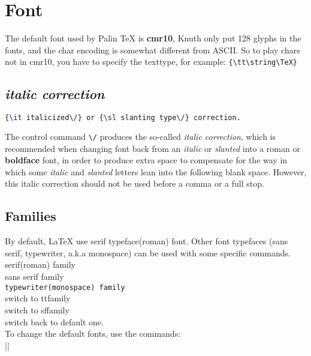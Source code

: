 \section{Font}
The default font used by Palin TeX is \textbf{cmr10}, Knuth only put 128 
glyphs in the fonts, and the char encoding is somewhat different from 
ASCII. So to play chars not in cmr10, you have to specify the texttype,
for example:
\verb|{\tt\string\TeX}|

\subsection{{\it italic correction}}
\begin{lstlisting}[language=TeX]
{\it italicized\/} or {\sl slanting type\/} correction.
\end{lstlisting}
The control command \verb|\/| produces the so-called {\it italic correction}, 
which is recommended when changing font back from an {\it italic} or 
{\sl slanted} into a {\rm roman} or {\bf boldface} font, in order to produce
extra space to compensate for the way in which some {\it italic} and 
{\sl slanted} letters lean into the following blank space. However, this
italic correction should not be used before a comma or a full stop.

\subsection{Families}
By default, \LaTeX{} use serif typeface(roman) font. Other font typefaces
(sans serif, typewriter, a.k.a monospace) can be used with some specific 
commands.
\textrm{serif(roman) family}	\\
\textsf{sans serif family}      \\
\texttt{typewriter(monospace) family}	\\
\ttfamily
switch to ttfamily  \\
\sffamily
switch to sffamily  \\
\rmfamily
switch back to default one. \\

To change the default fonts, use the commands:	\\
\command|\renewcommand{\familydefault}{\sfdefault}|

